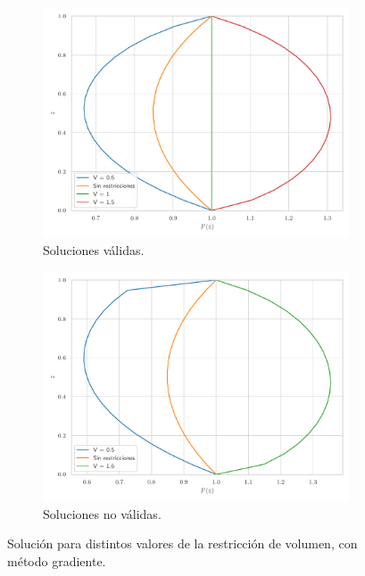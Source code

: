 \begin{figure}[h]
    \centering
    \begin{subfigure}[b]{0.45\textwidth}
        \centering
        \includegraphics[width=\textwidth]{Figures/01/vol_inic.pdf}
        \caption{Soluciones válidas.}
        \label{fig:vol_inic}
    \end{subfigure}
    \hfill
    \begin{subfigure}[b]{0.45\textwidth}
        \centering
        \includegraphics[width=\textwidth]{Figures/01/vol_no_sol.pdf}
        \caption{Soluciones no válidas.}
        \label{fig:vol_no_sol}
    \end{subfigure}
    \caption{Solución para distintos valores de la restricción de volumen, con método gradiente.}
    \label{fig:vol_variacion}
\end{figure}

